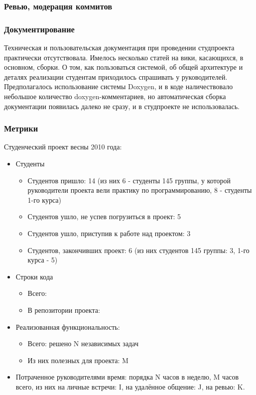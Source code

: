\documentclass[a5paper]{article}
\begin{document}
\subsubsection{Ревью, модерация коммитов}

\subsubsection{Документирование}
Техническая и пользовательская документация при проведении студпроекта практически отсутствовала. Имелось несколько статей на вики, касающихся, в основном, сборки. О том, как пользоваться системой, об общей архитектуре и деталях реализации студентам приходилось спрашивать у руководителей. Предполагалось использование системы Doxygen, и в коде наличествовало небольшое количество doxygen-комментариев, но автоматическая сборка документации появилась далеко не сразу, и в студпроекте не использовалась.

\subsubsection{Метрики}
Студенческий проект весны 2010 года:
\begin{itemize}
	\item Студенты
		\begin{itemize}
			\item Студентов пришло: 14 (из них 6 - студенты 145 группы, у которой руководители проекта вели практику по программированию, 8 - студенты 1-го курса)
			\item Студентов ушло, не успев погрузиться в проект: 5
			\item Студентов ушло, приступив к работе над проектом: 3
			\item Студентов, закончивших проект: 6 (из них студентов 145 группы: 3, 1-го курса - 5)
		\end{itemize}
	\item Строки кода
		\begin{itemize}
			\item Всего:
			\item В репозитории проекта:
		\end{itemize}
	\item Реализованная функциональность:
		\begin{itemize}
			\item Всего: решено N независимых задач 
			\item Из них полезных для проекта: M
		\end{itemize}
	\item Потраченное руководителями время: порядка N часов в неделю, M часов всего, из них на личные встречи: I, на удалённое общение: J, на ревью: K.
\end{itemize}
\end{document}
